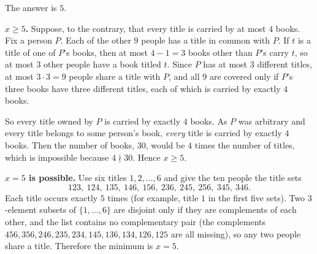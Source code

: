 The answer is $\boxed{5}$.

\textbf{$x\ge5$.} Suppose, to the contrary, that every title is carried by at most $4$ books. Fix a person $P$. Each of the other $9$ people has a title in common with $P$. If $t$ is a title of one of $P$'s books, then at most $4-1=3$ books other than $P$'s carry $t$, so at most $3$ other people have a book titled $t$. Since $P$ has at most $3$ different titles, at most $3\cdot3=9$ people share a title with $P$, and all $9$ are covered only if $P$'s three books have three different titles, each of which is carried by exactly $4$ books.

So every title owned by $P$ is carried by exactly $4$ books. As $P$ was arbitrary and every title belongs to some person's book, \emph{every} title is carried by exactly $4$ books. Then the number of books, $30$, would be $4$ times the number of titles, which is impossible because $4\nmid30$. Hence $x\ge5$.

\textbf{$x=5$ is possible.} Use six titles $1,2,\dots,6$ and give the ten people the title sets
\[123,\ 124,\ 135,\ 146,\ 156,\ 236,\ 245,\ 256,\ 345,\ 346.\]
Each title occurs exactly $5$ times (for example, title $1$ in the first five sets). Two $3$-element subsets of $\{1,\dots,6\}$ are disjoint only if they are complements of each other, and the list contains no complementary pair (the complements $456,356,246,235,234,145,136,134,126,125$ are all missing), so any two people share a title. Therefore the minimum is $x=5$.
